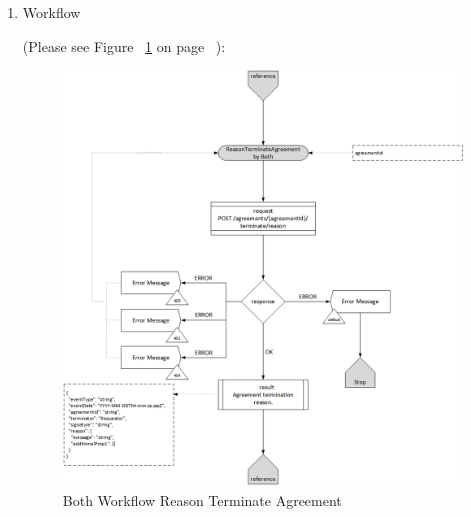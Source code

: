 \begin{enumerate}
\begin{center}
\begin{tabular}{|p{3cm}|l|p{3cm}|p{3cm}|p{4cm}|}
\end{tabular}
\end{center}

\item Workflow

(Please see Figure ~\ref{fig:BRTA} on page ~\pageref{fig:BRTA}):

\begin{figure}[htbp]
    \centering
    \includegraphics[width=11cm,height=11cm,angle=0]{./diag/Workflow/Market/ReasonTerminateAgreement-B-Workflow.png}
    \caption{Both Workflow Reason Terminate Agreement  }
	\label{fig:BRTA}
\end{figure}

\end{enumerate}

\newpage




